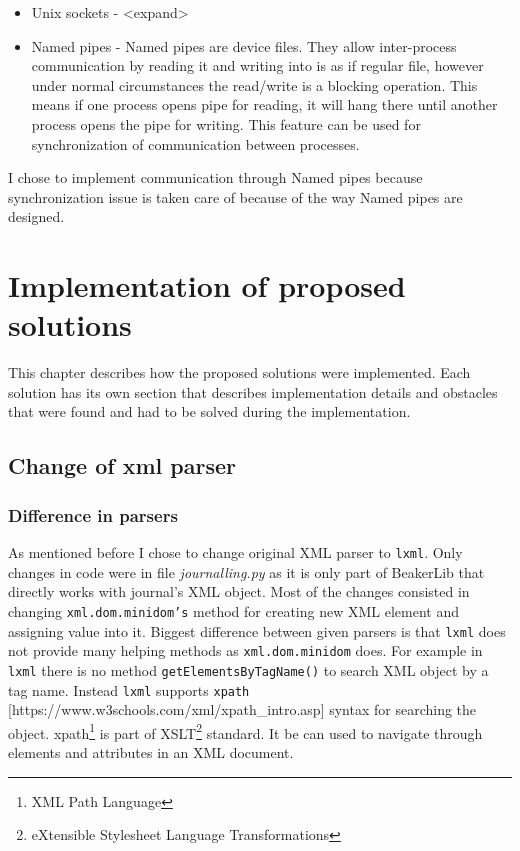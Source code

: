 \begin{itemize}
\item Unix sockets  -  <expand>
\item Named pipes - Named pipes are device files. They allow inter-process communication by reading it and writing into is as if regular file, however under normal circumstances the read/write is a blocking operation. This means if one process opens pipe for reading, it will hang there until another process opens the pipe for writing. This feature can be used for synchronization of communication between processes. 
\end{itemize}


I chose to implement communication through Named pipes because synchronization issue is taken care of because of the way Named pipes are designed.


\chapter{Implementation of proposed solutions}
\label{implementations}
This chapter describes how the proposed solutions were implemented. Each solution has its own section that describes implementation details and obstacles that were found and had to be solved during the implementation.

\section{Change of xml parser}
\subsection{Difference in parsers}
As mentioned before I chose to change original XML parser to \texttt{lxml}. Only changes in code were in file \textit{journalling.py} as it is only part of BeakerLib that directly works with journal's XML object. 
Most of the changes consisted in changing \texttt{xml.dom.minidom's} method for creating new XML element and assigning value into it.
Biggest difference between given parsers is that \texttt{lxml} does not provide many helping methods as \texttt{xml.dom.minidom} does.
For example in \texttt{lxml}  there is no method \texttt{getElementsByTagName()} to search XML object by a tag name. Instead \texttt{lxml} supports \texttt{xpath} [https://www.w3schools.com/xml/xpath\_intro.asp] syntax for searching the object. xpath\footnote{XML Path Language} is part of XSLT\footnote{eXtensible Stylesheet Language Transformations} standard. It be can used to navigate through elements and attributes in an XML document.

